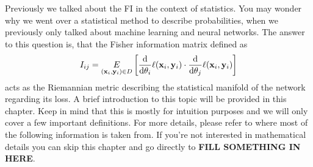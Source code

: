 Previously we talked about the FI in the context of statistics. You may wonder why we went over a statistical method to describe probabilities, when we previously only talked about machine learning and neural networks. The answer to this question is, that the Fisher information matrix defined as 
\begin{equation}
	I_{ij} = \underset{(\mathbf{x}_i,\mathbf{y}_i) \in D}{E} \left[\frac{\mathrm{d}}{\mathrm{d}\theta_i}\ell(\mathbf{x}_i,\mathbf{y}_i)\cdot \frac{\mathrm{d}}{\mathrm{d}\theta_j}\ell(\mathbf{x}_i,\mathbf{y}_i)\right]
\end{equation}
acts as the Riemannian metric describing the statistical manifold of the network regarding its loss. A brief introduction to this topic will be provided in this chapter. Keep in mind that this is mostly for intuition purposes and we will only cover a few important definitions. For more details, please refer to \cite{AmarisLectureNotes} where most of the following information is taken from. If you're not interested in mathematical details you can skip this chapter and go directly to \textbf{FILL SOMETHING IN HERE}.

